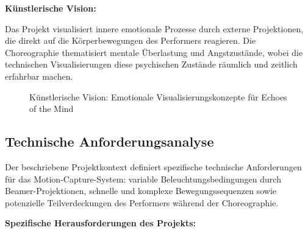 \newpage

\textbf{Künstlerische Vision:}

\raggedright Das Projekt visualisiert innere emotionale Prozesse durch externe Projektionen, die direkt auf die Körperbewegungen des Performers reagieren. Die Choreographie thematisiert mentale Überlastung und Angstzustände, wobei die technischen Visualisierungen diese psychischen Zustände räumlich und zeitlich erfahrbar machen.

\begin{figure}[htbp]
    \centering
    \caption{Künstlerische Vision: Emotionale Visualisierungskonzepte für \glqq Echoes of the Mind\grqq{}}
    \label{fig:echoes_mood}
\end{figure}

\subsection{Technische Anforderungsanalyse}

Der beschriebene Projektkontext definiert spezifische technische Anforderungen für das Motion-Capture-System: variable Beleuchtungsbedingungen durch Beamer-Projektionen, schnelle und komplexe Bewegungssequenzen sowie potenzielle Teilverdeckungen des Performers während der Choreographie. 

\textbf{Spezifische Herausforderungen des Projekts:}

